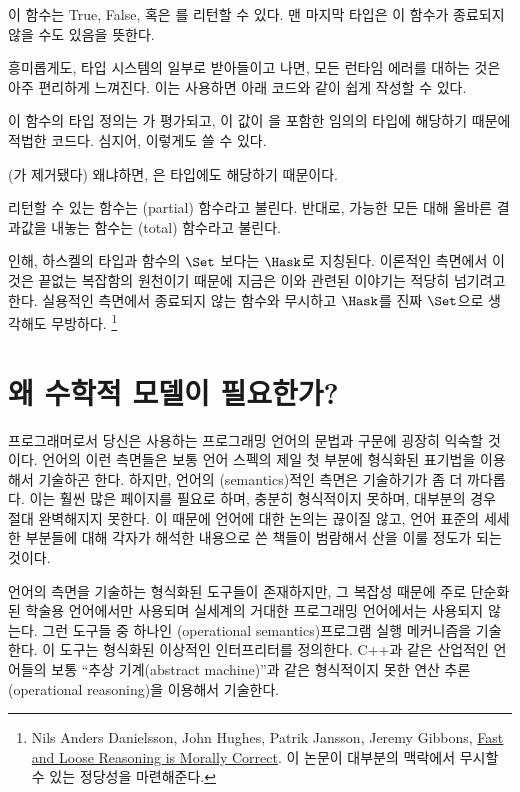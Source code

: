 이 함수는 True, False, 혹은 \code{\_|\_}를 리턴할 수 있다. 맨 마지막 타입은 이 함수가 종료되지 않을 수도 있음을 뜻한다.

흥미롭게도, \trBottom\을 타입 시스템의 일부로 받아들이고 나면, 모든 런타임 에러를 \trBottom{} 대하는 것은 아주 편리하게 느껴진다. 이는  \trExpression\을 사용하면 아래 코드와 같이 쉽게 작성할 수 있다.


이 함수의 타입 정의는 가 \trBottom{} 평가되고, 이 값이 을 포함한 임의의 타입에 해당하기 때문에 적법한 코드다. 심지어, 이렇게도 쓸 수 있다.


(가 제거됐다) 왜냐하면, \trBottom 은  타입에도 해당하기 때문이다.

\trBottom\을 리턴할 수 있는 함수는 \trPartial(partial) 함수라고 불린다. 반대로, 가능한 모든  대해 올바른 결과값을 내놓는 함수는 \trTotal(total) 함수라고 불린다.

\trBottom{} 인해, 하스켈의 타입과 함수의 \trCategory\는 $\Set$ 보다는 $\Hask$로 지칭된다.
이론적인 측면에서 이것은 끝없는 복잡함의 원천이기 때문에 지금은 이와 관련된 이야기는 적당히 넘기려고 한다. 실용적인 측면에서 종료되지 않는 함수와 \trBottom\을 무시하고 $\Hask$를 진짜 $\Set$으로 생각해도 무방하다.
\footnote{Nils Anders Danielsson,
John Hughes, Patrik Jansson, Jeremy Gibbons, \href{http://www.cs.ox.ac.uk/jeremy.gibbons/publications/fast+loose.pdf}{
Fast and Loose Reasoning is Morally Correct}. 이 논문이 대부분의 맥락에서 \trBottom\을 무시할 수 있는 정당성을 마련해준다.}

\section{왜 수학적 모델이 필요한가?}

프로그래머로서 당신은 사용하는 프로그래밍 언어의 문법과 구문에 굉장히 익숙할 것이다.
언어의 이런 측면들은 보통 언어 스펙의 제일 첫 부분에 형식화된 표기법을 이용해서 기술하곤 한다. 
하지만, 언어의 \trSemantics(semantics)적인 측면은 기술하기가 좀 더 까다롭다. 이는 훨씬 많은 페이지를 필요로 하며, 충분히 형식적이지 못하며, 대부분의 경우 절대 완벽해지지 못한다.
이 때문에 언어에 대한 논의는 끊이질 않고, 언어 표준의 세세한 부분들에 대해 각자가 해석한 내용으로 쓴 책들이 범람해서 산을 이룰 정도가 되는 것이다.

언어의  측면을 기술하는 형식화된 도구들이 존재하지만, 그 복잡성 때문에 주로 단순화된 학술용 언어에서만 사용되며 실세계의 거대한 프로그래밍 언어에서는 사용되지 않는다.
그런 도구들 중 하나인 \newterm{\trOperationalSemantics}(operational semantics)\는 프로그램 실행 메커니즘을 기술한다. 이 도구는 형식화된 이상적인 인터프리터를 정의한다.
C++과 같은 산업적인 언어들의 \trSemantics\는 보통 ``추상 기계(abstract machine)''과 같은 형식적이지 못한 연산 추론(operational reasoning)을 이용해서 기술한다.

